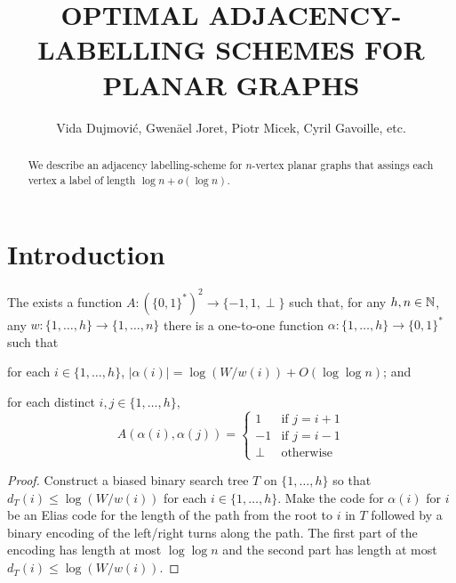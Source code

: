 \documentclass[kpfonts]{patmorin}
\title{\MakeUppercase{Optimal Adjacency-Labelling Schemes for Planar Graphs}}
\author{Vida Dujmović, Gwenäel Joret, Piotr Micek, Cyril Gavoille, etc.}
\begin{document}
\maketitle

\begin{abstract}
  We describe an adjacency labelling-scheme for $n$-vertex planar graphs that assings each vertex a label of length $\log n+o(\log n)$.
\end{abstract}

\section{Introduction}

\begin{lem}
  The exists a function $A:(\{0,1\}^*)^2\to\{-1,1,\perp\}$ such that, for any $h,n\in\mathbb{N}$, any $w:\{1,\ldots,h\}\to\{1,\ldots,n\}$ there is a one-to-one function $\alpha:\{1,\ldots,h\}\to \{0,1\}^*$ such that 
  \begin{compactenum}
    \item for each $i\in\{1,\ldots,h\}$, $|\alpha(i)|=\log(W/w(i)) + O(\log\log n)$; and
    \item for each distinct $i,j\in\{1,\ldots,h\}$, 
    \[   A(\alpha(i),\alpha(j)) 
    = \begin{cases}
       1 & \text{if $j=i+1$} \\
       -1 & \text{if $j=i-1$} \\
       \perp & \text{otherwise}
      \end{cases}
      \]
    \end{compactenum}
\end{lem}

\begin{proof}
  Construct a biased binary search tree $T$ on $\{1,\ldots,h\}$ so that $d_T(i)\le\log (W/w(i))$ for each $i\in\{1,\ldots,h\}$.  Make the code for $\alpha(i)$ for $i$ be an Elias code for the length of the path from the root to $i$ in $T$ followed by a binary encoding of the left/right turns along the path.  The first part of the encoding has length at most $\log\log n$ and the second part has length at most $d_T(i)\le\log(W/w(i))$. 
\end{proof}
\end{document}
